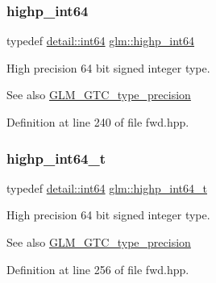 \subsubsection{\texorpdfstring{highp\+\_\+int64}{highp\_int64}}
{\footnotesize\ttfamily typedef \hyperlink{namespaceglm_1_1detail_a5b1c3227ec636c24a0676746381adfc8}{detail\+::int64} \hyperlink{group__gtc__type__precision_ga7ffb27943e9569800979081bc548621c}{glm\+::highp\+\_\+int64}}

High precision 64 bit signed integer type. \begin{DoxySeeAlso}{See also}
\hyperlink{group__gtc__type__precision}{G\+L\+M\+\_\+\+G\+T\+C\+\_\+type\+\_\+precision} 
\end{DoxySeeAlso}


Definition at line 240 of file fwd.\+hpp.

\mbox{\label{group__gtc__type__precision_ga0f5186bde44471133b08057cae8a51ac}} 
\subsubsection{\texorpdfstring{highp\+\_\+int64\+\_\+t}{highp\_int64\_t}}
{\footnotesize\ttfamily typedef \hyperlink{namespaceglm_1_1detail_a5b1c3227ec636c24a0676746381adfc8}{detail\+::int64} \hyperlink{group__gtc__type__precision_ga0f5186bde44471133b08057cae8a51ac}{glm\+::highp\+\_\+int64\+\_\+t}}

High precision 64 bit signed integer type. \begin{DoxySeeAlso}{See also}
\hyperlink{group__gtc__type__precision}{G\+L\+M\+\_\+\+G\+T\+C\+\_\+type\+\_\+precision} 
\end{DoxySeeAlso}


Definition at line 256 of file fwd.\+hpp.

\mbox{\label{group__gtc__type__precision_ga57c86999e666760c304453f9bfdc09d1}} 
